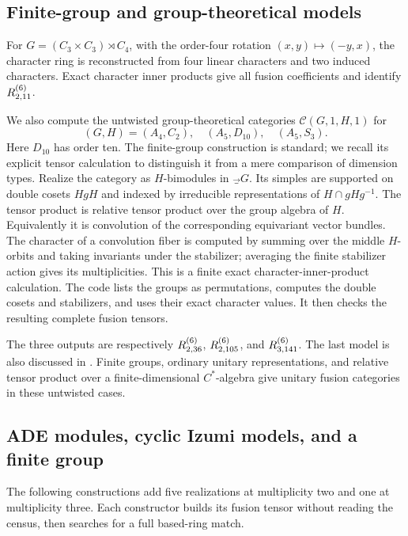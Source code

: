 \subsection{Finite-group and group-theoretical models}
For $G=(C_3\times C_3)\rtimes C_4$, with the order-four rotation
$(x,y)\mapsto(-y,x)$, the character ring is reconstructed from four
linear characters and two induced characters. Exact character inner
products give all fusion coefficients and identify $R^{(6)}_{2,11}$.

We also compute the untwisted group-theoretical categories
$\mathcal C(G,1,H,1)$ for
\[
 (G,H)=(A_4,C_2),\quad(A_5,D_{10}),\quad(A_5,S_3).
\]
Here $D_{10}$ has order ten. The finite-group construction is standard;
we recall its explicit tensor calculation to distinguish it from a
mere comparison of dimension types. Realize the category as
$H$-bimodules in $\Vec_G$. Its simples are supported on double cosets
$HgH$ and indexed by irreducible representations of
$H\cap gHg^{-1}$. The tensor product is relative tensor product over
the group algebra of $H$. Equivalently it is convolution of the
corresponding equivariant vector bundles. The character of a convolution
fiber is computed by summing over the middle $H$-orbits and taking
invariants under the stabilizer; averaging the finite stabilizer action
gives its multiplicities. This is a finite exact character-inner-product
calculation. The code lists the groups as permutations, computes the
double cosets and stabilizers, and uses their exact character values.
It then checks the resulting complete fusion tensors.

The three outputs are respectively $R^{(6)}_{2,36}$,
$R^{(6)}_{2,105}$, and $R^{(6)}_{3,141}$. The last model is also discussed in
\cite[Section~6.5]{Integral}. Finite groups, ordinary unitary
representations, and relative tensor product over a finite-dimensional
$C^*$-algebra give unitary fusion categories in these untwisted cases.

\subsection{ADE modules, cyclic Izumi models, and a finite group}\label{sec:additionalmodels}
The following constructions add five realizations at multiplicity two
and one at multiplicity three. Each constructor builds its fusion tensor
without reading the census, then searches for a full based-ring match.

